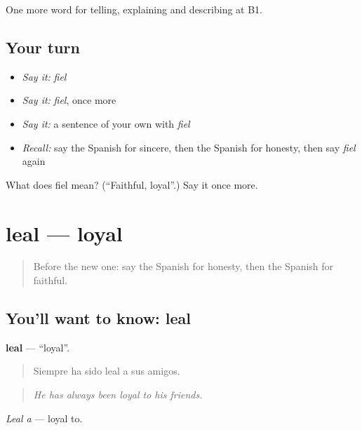 \begin{grammarlens}[title={What you've built}]
One more word for telling, explaining and describing at B1.
\end{grammarlens}

\subsection*{Your turn}
\begin{itemize}
\raggedright
  \item \emph{Say it:} \emph{fiel}
  \item \emph{Say it:} \emph{fiel}, once more
  \item \emph{Say it:} a sentence of your own with \emph{fiel}
  \item \emph{Recall:} say the Spanish for sincere, then the Spanish for honesty, then say \emph{fiel} again
\end{itemize}

\begin{tcolorbox}[breakable,colback=teal!4,colframe=teal!35!black,title={Before you move on}]
What does fiel mean? (\textquotedblleft{}Faithful, loyal\textquotedblright{}.) Say it once more.
\end{tcolorbox}
\section[leal]{leal — loyal}

\label{lesson:ES-C725-leal}



\begin{quote}
Before the new one: say the Spanish for honesty, then the Spanish for faithful.
\end{quote}

\subsection*{You'll want to know: leal}
\textbf{leal} — \textquotedblleft{}loyal\textquotedblright{}.

\begin{quote}
Siempre ha sido leal a sus amigos.
\end{quote}

\begin{quote}
\emph{He has always been loyal to his friends.}
\end{quote}

\emph{Leal a} — loyal to.

